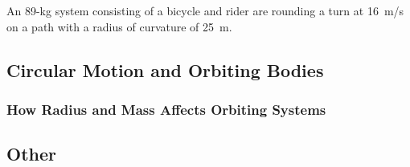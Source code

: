 \documentclass[../main-physics-workbook.tex]{subfiles}
\begin{document}
\begin{questions}
\question \label{Kv8Old} %
An 89-kg system consisting of a bicycle and rider are rounding a turn at \SI{16}{m/s} on a path with a radius of curvature of \SI{25}{m}. 





\end{questions}


\subsection{Circular Motion and Orbiting Bodies}

\subsubsection{How Radius and Mass Affects Orbiting Systems}

\subsection{Other}
\end{document}
